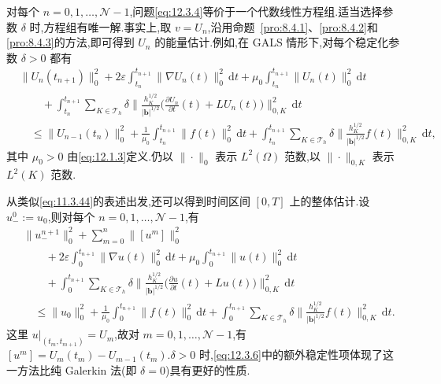 对每个 \(n=0,1,\ldots,\mathcal N-1\),问题\eqref{eq:12.3.4}等价于一个代数线性方程组.适当选择参数 \(\delta\) 时,方程组有唯一解.事实上,取 \(v=U_n\),沿用命题~\ref{pro:8.4.1}、\ref{pro:8.4.2}和\ref{pro:8.4.3}的方法,即可得到 \(U_n\) 的能量估计.例如,在 GALS 情形下,对每个稳定化参数 \(\delta>0\) 都有
\begin{equation}\label{eq:12.3.5}
  \begin{aligned}
    &\|U_n(t_{n+1})\|_0^2+2\varepsilon\int_{t_n}^{t_{n+1}}\|\nabla U_n(t)\|_0^2\,\mathrm dt
       +\mu_0\int_{t_n}^{t_{n+1}}\|U_n(t)\|_0^2\,\mathrm dt\\
    &\qquad+\int_{t_n}^{t_{n+1}}\sum_{K\in\mathcal T_h}\delta
       \biggl\|\frac{h_K^{1/2}}{|\boldsymbol{b}|^{1/2}}
          \biggl(\frac{\partial U_n}{\partial t}(t)+LU_n(t)\biggr)\biggr\|_{0,K}^2\,\mathrm dt\\
    &\quad\le\|U_{n-1}(t_n)\|_0^2+\frac1{\mu_0}\int_{t_n}^{t_{n+1}}\|f(t)\|_0^2\,\mathrm dt
       +\int_{t_n}^{t_{n+1}}\sum_{K\in\mathcal T_h}\delta
           \biggl\|\frac{h_K^{1/2}}{|\boldsymbol{b}|^{1/2}}f(t)\biggr\|_{0,K}^2\,\mathrm dt,
  \end{aligned}
\end{equation}
其中 \(\mu_0>0\) 由\eqref{eq:12.1.3}定义.仍以 \(\|\cdot\|_0\) 表示 \(L^2(\Omega)\) 范数,以 \(\|\cdot\|_{0,K}\) 表示 \(L^2(K)\) 范数.

从类似\eqref{eq:11.3.44}的表述出发,还可以得到时间区间 \([0,T]\) 上的整体估计.设 \(u_-^0:=u_0\),则对每个 \(n=0,1,\ldots,\mathcal N-1\),有
\begin{equation}\label{eq:12.3.6}
  \begin{aligned}
    &\|u_-^{n+1}\|_0^2+\sum_{m=0}^n\|[u^m]\|_0^2\\
    &\qquad+2\varepsilon\int_0^{t_{n+1}}\|\nabla u(t)\|_0^2\,\mathrm dt
       +\mu_0\int_0^{t_{n+1}}\|u(t)\|_0^2\,\mathrm dt\\
    &\qquad+\int_0^{t_{n+1}}\sum_{K\in\mathcal T_h}\delta
       \biggl\|\frac{h_K^{1/2}}{|\boldsymbol{b}|^{1/2}}
         \biggl(\frac{\partial u}{\partial t}(t)+Lu(t)\biggr)\biggr\|_{0,K}^2\,\mathrm dt\\
    &\quad\le\|u_0\|_0^2+\frac1{\mu_0}\int_0^{t_{n+1}}\|f(t)\|_0^2\,\mathrm dt
       +\int_0^{t_{n+1}}\sum_{K\in\mathcal T_h}\delta
         \biggl\|\frac{h_K^{1/2}}{|\boldsymbol{b}|^{1/2}}f(t)\biggr\|_{0,K}^2\,\mathrm dt.
  \end{aligned}
\end{equation}
这里 \(u|_{(t_m,t_{m+1})}=U_m\),故对 \(m=0,1,\ldots,\mathcal N-1\),有 \([u^m]=U_m(t_m)-U_{m-1}(t_m)\).\(\delta>0\) 时,\eqref{eq:12.3.6}中的额外稳定性项体现了这一方法比纯 Galerkin 法(即 \(\delta=0\))具有更好的性质.

